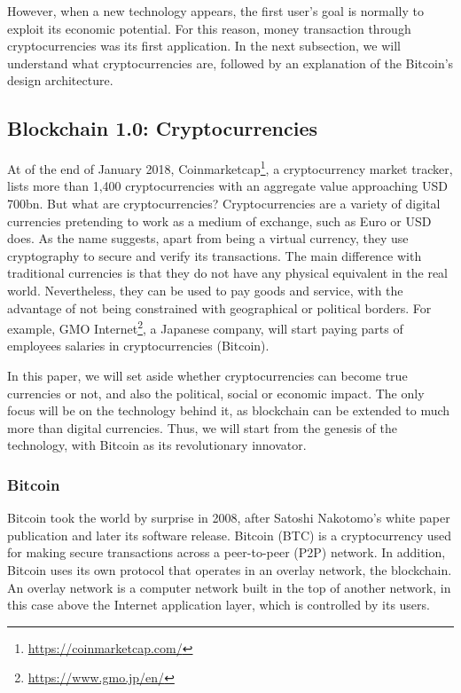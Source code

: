 However, when a new technology appears, the first user's goal is normally to exploit its economic potential. For this reason, money transaction through cryptocurrencies was its first application. In the next subsection, we will understand what cryptocurrencies are, followed by an explanation of the Bitcoin's design architecture.

\subsection{Blockchain 1.0: Cryptocurrencies}

At of the end of January 2018, Coinmarketcap\footnote{\url{https://coinmarketcap.com/}}, a cryptocurrency market tracker, lists more than 1,400 cryptocurrencies with an aggregate value approaching USD 700bn. But what are cryptocurrencies? Cryptocurrencies are a variety of digital currencies pretending to work as a medium of exchange, such as Euro or USD does. As the name suggests, apart from being a virtual currency, they use cryptography to secure and verify its transactions. The main difference with traditional currencies is that they do not have any physical equivalent in the real world. Nevertheless, they can be used to pay goods and service, with the advantage of not being constrained with geographical or political borders. For example, GMO Internet\footnote{\url{https://www.gmo.jp/en/}}, a Japanese company, will start paying parts of employees salaries in cryptocurrencies (Bitcoin).

In this paper, we will set aside whether cryptocurrencies can become true currencies or not, and also the political, social or economic impact. The only focus will be on the technology behind it, as blockchain can be extended to much more than digital currencies. Thus, we will start from the genesis of the technology, with Bitcoin as its revolutionary innovator.


\subsubsection{Bitcoin}

Bitcoin took the world by surprise in 2008, after Satoshi Nakotomo's white paper publication \cite{nakamoto2008bitcoin} and later its software release. Bitcoin (BTC) is a cryptocurrency used for making secure transactions across a peer-to-peer (P2P) network. In addition, Bitcoin uses its own protocol that operates in an overlay network, the blockchain. An overlay network is a computer network built in the top of another network, in this case above the Internet application layer, which is controlled by its users.

